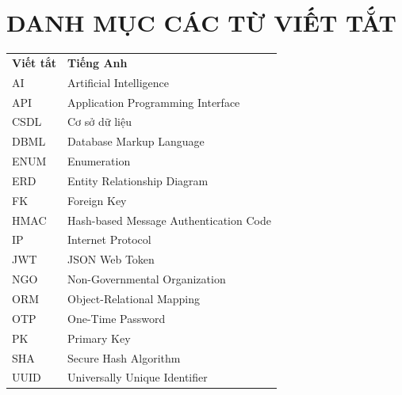 \newpage
\section*{DANH MỤC CÁC TỪ VIẾT TẮT}

{
\renewcommand{\arraystretch}{1.3}
\begin{longtable}{ >{\centering\arraybackslash}p{3cm} p{9cm} }
    \textbf{Viết tắt} & \textbf{Tiếng Anh} \\

    AI & Artificial Intelligence \\
    API & Application Programming Interface \\
    CSDL & Cơ sở dữ liệu \\
    DBML & Database Markup Language \\
    ENUM & Enumeration \\
    ERD & Entity Relationship Diagram \\
    FK & Foreign Key \\
    HMAC & Hash-based Message Authentication Code \\
    IP & Internet Protocol \\
    JWT & JSON Web Token \\
    NGO & Non-Governmental Organization \\
    ORM & Object-Relational Mapping \\
    OTP & One-Time Password \\
    PK & Primary Key \\
    SHA & Secure Hash Algorithm \\
    UUID & Universally Unique Identifier \\
\end{longtable}
}
